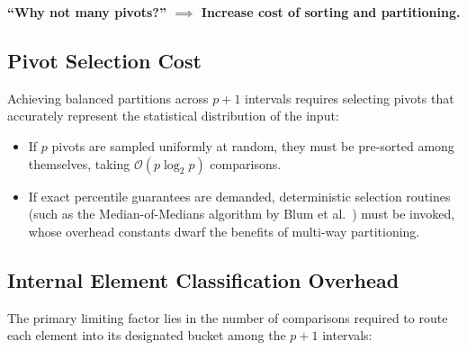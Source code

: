 \begin{center}
  \bfseries ``Why not many pivots?'' $\implies$ Increase cost of sorting and partitioning.
\end{center}

\subsection{Pivot Selection Cost}
Achieving balanced partitions across $p + 1$ intervals requires selecting pivots that accurately represent the statistical distribution of the input:
\begin{itemize}
  \item If $p$ pivots are sampled uniformly at random, they must be pre-sorted among themselves, taking $\mathcal{O}(p \log_2 p)$ comparisons.
  \item If exact percentile guarantees are demanded, deterministic selection routines (such as the Median-of-Medians algorithm by Blum et al.~\cite{blum1973}) must be invoked, whose overhead constants dwarf the benefits of multi-way partitioning.
\end{itemize}

\subsection{Internal Element Classification Overhead}
The primary limiting factor lies in the number of comparisons required to route each element into its designated bucket among the $p + 1$ intervals:

